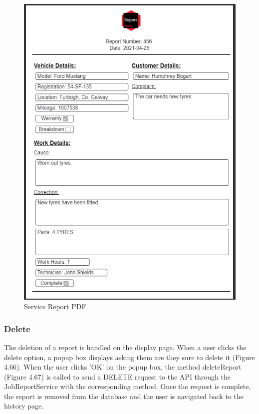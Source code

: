 \begin{figure}[H]
    \centering
    \caption{Service Report PDF}
    \label{image:reportPDF}
    \includegraphics[width=1.0\textwidth]{images/repota/service_report_pdf.png}
\end{figure}

\subsubsection{Delete}
The deletion of a report is handled on the display page. When a user clicks the delete option, a popup box displays asking them are they sure to delete it (Figure 4.66). When the user clicks 'OK' on the popup box, the method deleteReport (Figure 4.67) is called to send a DELETE request to the API through the JobReportService with the corresponding method. Once the request is complete, the report is removed from the database and the user is navigated back to the history page.

